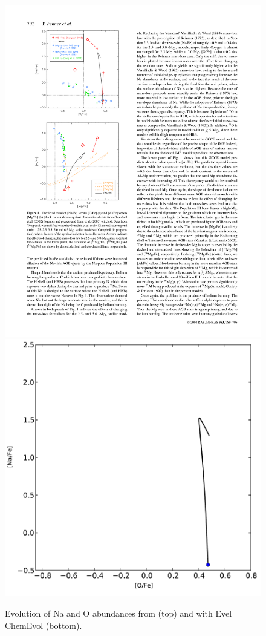 \begin{figure}
 \begin{center}\includegraphics[height=0.45\textheight]{figures/Fenner04-Na-O}\\
 \includegraphics[height=0.45\textheight]{figures/cemodel-Na-O}\end{center}
 \caption{Evolution of Na and O abundances from \citet{Fenner:2004ju} (top) and with Evel ChemEvol (bottom).}\label{fig:cemodel-nao}
\end{figure}

